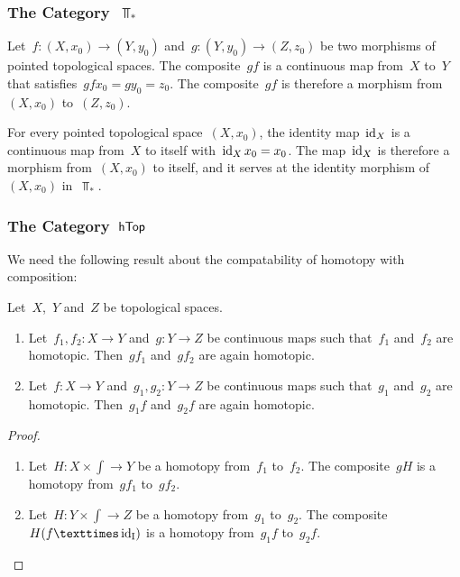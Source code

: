 \subsubsection{The Category~$\Top_*$}

Let~$f \colon (X, x_0) \to (Y, y_0)$ and~$g \colon (Y, y_0) \to (Z, z_0)$ be two morphisms of pointed topological spaces.
The composite~$g f$ is a continuous map from~$X$ to~$Y$ that satisfies~$g f x_0 = g y_0 = z_0$.
The composite~$g f$ is therefore a morphism from~$(X, x_0)$ to~$(Z, z_0)$.

For every pointed topological space~$(X, x_0)$, the identity map~$\operatorname{id}_X$ is a continuous map from~$X$ to itself with~$\operatorname{id}_X x_0 = x_0$.
The map~$\operatorname{id}_X$ is therefore a morphism from~$(X, x_0)$ to itself, and it serves at the identity morphism of~$(X, x_0)$ in~$\Top_*$.



\subsubsection{The Category~$\mathsf{hTop}$}

We need the following result about the compatability of homotopy with composition:

\begin{proposition}
	Let~$X$,~$Y$ and~$Z$ be topological spaces.
	\begin{enumerate}

		\item
			Let~$f_1, f_2 \colon X \to Y$ and~$g \colon Y \to Z$ be continuous maps such that~$f_1$ and~$f_2$ are homotopic.
			Then~$g f_1$ and~$g f_2$ are again homotopic.

		\item
			Let~$f \colon X \to Y$ and~$g_1, g_2 \colon Y \to Z$ be continuous maps such that~$g_1$ and~$g_2$ are homotopic.
			Then~$g_1 f$ and~$g_2 f$ are again homotopic.

	\end{enumerate}
\end{proposition}

\begin{proof}
	\leavevmode
	\begin{enumerate}

		\item
			Let~$H \colon X × \int \to Y$ be a homotopy from~$f_1$ to~$f_2$.
			The composite~$g H$ is a homotopy from~$g f_1$ to~$g f_2$.

		\item
			Let~$H \colon Y × \int \to Z$ be a homotopy from~$g_1$ to~$g_2$.
			The composite~$H (f × \id_{\int})$ is a homotopy from~$g_1 f$ to~$g_2 f$.
		\qedhere

	\end{enumerate}
\end{proof}

